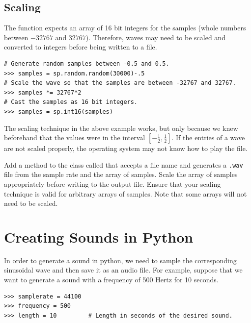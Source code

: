 \subsection*{Scaling} %

The  function expects an array of 16 bit integers for the samples (whole numbers between $-32767$ and $32767$).
Therefore, waves may need to be scaled and converted to integers before being written to a file.

\begin{lstlisting}
# Generate random samples between -0.5 and 0.5.
>>> samples = sp.random.random(30000)-.5
# Scale the wave so that the samples are between -32767 and 32767.
>>> samples *= 32767*2
# Cast the samples as 16 bit integers.
>>> samples = sp.int16(samples)
\end{lstlisting}

The scaling technique in the above example works, but only because we knew beforehand that the values were in the interval $[-\frac{1}{2}, \frac{1}{2}]$.
If the entries of a wave are not scaled properly, the operating system may not know how to play the file.

\begin{problem}
Add a method to the  class called  that accepts a file name and generates a \texttt{.wav} file from the sample rate and the array of samples.
Scale the array of samples appropriately before writing to the output file.
Ensure that your scaling technique is valid for arbitrary arrays of samples.
Note that some arrays will not need to be scaled.
\end{problem}

\section*{Creating Sounds in Python} %

In order to generate a sound in python, we need to sample the corresponding sinusoidal wave and then save it as an audio file.
For example, suppose that we want to generate a sound with a frequency of 500 Hertz for 10 seconds.

\begin{lstlisting}
>>> samplerate = 44100
>>> frequency = 500
>>> length = 10         # Length in seconds of the desired sound.
\end{lstlisting}

